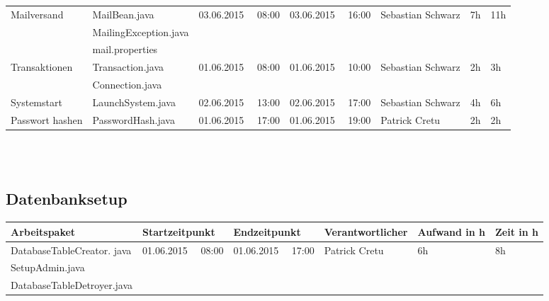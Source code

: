 \begin{landscape}
\begin{tabular}{|p{5.0cm} |p{6.0 cm}|p{3.2cm}|p{3.2cm}|p{3.3cm}|p{1.7cm}|p{1.5cm}|}
		\hline  Mailversand          & MailBean.java                              & 03.06.2015 \ \ 08:00       & 03.06.2015  \ \  16:00      & Sebastian Schwarz &  7h       & 11h\\ 	
		& MailingException.java                      &                            &                            &                             &                     &\\
		& mail.properties                            &                            &                            &                             &                     &\\
		\hline Transaktionen         & Transaction.java                           & 01.06.2015 \ \ 08:00       & 01.06.2015 \ \ 10:00       & Sebastian Schwarz   &  2h       &  3h     \\  
		& Connection.java                            &                            &                            &                             &                    &\\                 
		\hline Systemstart           & LaunchSystem.java                          & 02.06.2015 \ \ 13:00       & 02.06.2015 \ \ 17:00       & Sebastian Schwarz  & 4h     &   6h  \\
		\hline Passwort hashen       & PasswordHash.java                          & 01.06.2015 \ \ 17:00       & 01.06.2015 \ \ 19:00       & Patrick Cretu  & 2h     &   2h       \\       	   
		\hline 
	\end{tabular} \ \\
	\ \\
	
	\subsection{Datenbanksetup}
	\begin{tabular}{|p{10.3cm}|p{3.2cm}|p{3.2cm}|p{3.5cm}|p{1.7cm}|p{1.5cm}|}
		\hline  \textbf{Arbeitspaket} & \textbf{Startzeitpunkt} & \textbf{Endzeitpunkt} & \textbf{Verantwortlicher}  & \textbf{Aufwand in h} & \textbf{Zeit in h}\\ 
		\hline DatabaseTableCreator. java                 & 01.06.2015 \ \ 08:00       & 01.06.2015  \ \  17:00       & Patrick Cretu &  6h        &   8h   \\
		SetupAdmin.java                            &                            &                            &                    &                            &\\
		DatabaseTableDetroyer.java                 &                            &                            &                    &                           &\\
		\hline 
	\end{tabular} \ \\
	\ \\
	

\end{landscape}
